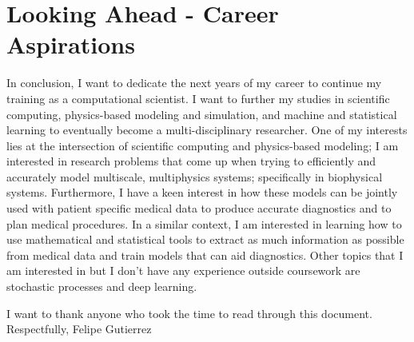 \documentclass{article}
\theoremstyle{definition}
\begin{document}
\section*{Looking Ahead - Career Aspirations}

In conclusion, I want to dedicate the next years of my career to continue my training as a computational scientist. I want to further my studies in scientific computing, physics-based modeling and simulation, and machine and statistical learning to eventually become a multi-disciplinary researcher. One of my interests lies at the intersection of scientific computing and physics-based modeling; I am interested in research problems that come up when trying to efficiently and accurately model multiscale, multiphysics systems; specifically in biophysical systems. Furthermore, I have a keen interest in how these models can be jointly used with patient specific medical data to produce accurate diagnostics and to plan medical procedures. In a similar context, I am interested in learning how to use mathematical and statistical tools to extract as much information as possible from medical data and train models that can aid diagnostics. Other topics that I am interested in but I don't have any experience outside coursework are stochastic processes and deep learning. \linebreak

I want to thank anyone who took the time to read through this document. \linebreak
\linebreak
Respectfully,\linebreak
Felipe Gutierrez




\end{document}
